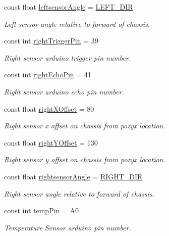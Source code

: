 \begin{DoxyCompactItemize}
const float \mbox{\hyperlink{bot_main_8ino_a8be5324bad65fa0bad41e0c70066a958}{leftsensor\+Angle}} = \mbox{\hyperlink{bot_main_8ino_a748e2ff253570331d3cd8f51ccc17f03}{L\+E\+F\+T\+\_\+\+D\+IR}}
\begin{DoxyCompactList}\small\item\em Left sensor angle relative to forward of chassis. \end{DoxyCompactList}\item 
const int \mbox{\hyperlink{bot_main_8ino_ad7785c889e9d6290073148f74ce9de5e}{right\+Trigger\+Pin}} = 39
\begin{DoxyCompactList}\small\item\em Right sensor arduino trigger pin number. \end{DoxyCompactList}\item 
const int \mbox{\hyperlink{bot_main_8ino_a922d02edb9759eb944c27cebb4a448cb}{right\+Echo\+Pin}} = 41
\begin{DoxyCompactList}\small\item\em Right sensor arduino echo pin number. \end{DoxyCompactList}\item 
const float \mbox{\hyperlink{bot_main_8ino_ac932cddb5bc68094c96d0034c92faef9}{right\+X\+Offset}} = 80
\begin{DoxyCompactList}\small\item\em Right sensor x offset on chassis from pozyx location. \end{DoxyCompactList}\item 
const float \mbox{\hyperlink{bot_main_8ino_a07903b96b48e8e456debd9cc43c7af05}{right\+Y\+Offset}} = 130
\begin{DoxyCompactList}\small\item\em Right sensor y offset on chassis from pozyx location. \end{DoxyCompactList}\item 
const float \mbox{\hyperlink{bot_main_8ino_a83724535498f068d5b44150a2bc4fcf8}{rightsensor\+Angle}} = \mbox{\hyperlink{bot_main_8ino_a280580881770229c533faab28f235a05}{R\+I\+G\+H\+T\+\_\+\+D\+IR}}
\begin{DoxyCompactList}\small\item\em Right sensor angle relative to forward of chassis. \end{DoxyCompactList}\item 
const int \mbox{\hyperlink{bot_main_8ino_a5aede016b3edcf8d5054eabe18c4ebd5}{temp\+Pin}} = A0
\begin{DoxyCompactList}\small\item\em Temperature Sensor arduino pin number. \end{DoxyCompactList}\item 

\end{DoxyCompactItemize}
